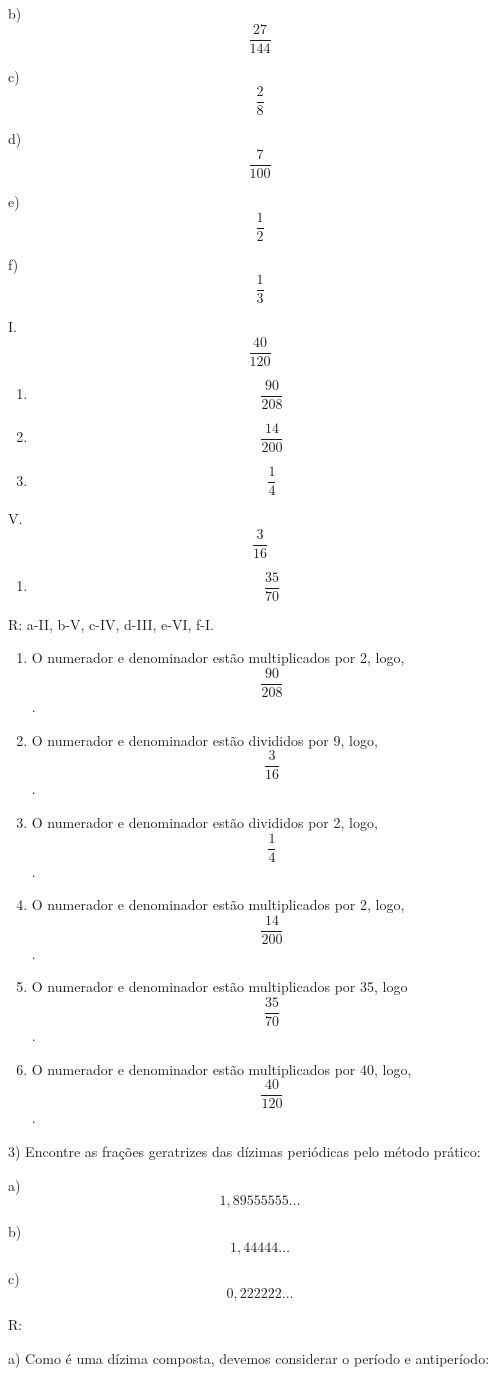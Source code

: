 b) \[\frac{27}{144}\]

c) \[\frac{2}{8}\]

d) \[\frac{7}{100}\]

e) \[\frac{1}{2}\]

f) \[\frac{1}{3}\]

I. \[\frac{40}{120}\]

\begin{enumerate}
\def\labelenumi{\Roman{enumi}.}
\setcounter{enumi}{1}
\item
  \[\frac{90}{208}\]
\item
  \[\frac{14}{200}\]
\item
  \[\frac{1}{4}\]
\end{enumerate}

V. \[\frac{3}{16}\]

\begin{enumerate}
\def\labelenumi{\Roman{enumi}.}
\setcounter{enumi}{5}
\tightlist
\item
  \[\frac{35}{70}\]
\end{enumerate}

R: a-II, b-V, c-IV, d-III, e-VI, f-I.

\begin{enumerate}
\def\labelenumi{\alph{enumi})}
\item
  O numerador e denominador estão multiplicados por 2, logo,
  \[\frac{90}{208}\].
\item
  O numerador e denominador estão divididos por 9, logo,
  \[\frac{3}{16}\].
\item
  O numerador e denominador estão divididos por 2, logo,
  \[\frac{1}{4}\].
\item
  O numerador e denominador estão multiplicados por 2, logo,
  \[\frac{14}{200}\].
\item
  O numerador e denominador estão multiplicados por 35, logo
  \[\frac{35}{70}\].
\item
  O numerador e denominador estão multiplicados por 40, logo,
  \[\frac{40}{120}\].
\end{enumerate}

3) Encontre as frações geratrizes das dízimas periódicas pelo método
prático:

a) \[1,89555555\ldots\]

b) \[1,44444\ldots\]

c) \[0,222222\ldots\]

R:

a) Como é uma dízima composta, devemos considerar o período e
antiperíodo:

